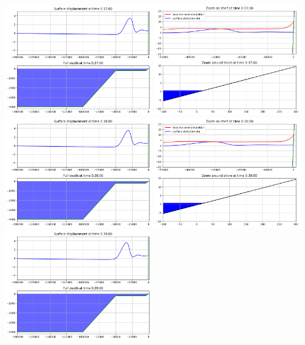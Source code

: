 \documentclass[11pt]{article}
\begin{document}
\vskip 10pt 
\includegraphics[width=0.475\textwidth]{frame0037fig0.png}
\includegraphics[width=0.475\textwidth]{frame0037fig1.png}
\vskip 10pt 
\includegraphics[width=0.475\textwidth]{frame0038fig0.png}
\includegraphics[width=0.475\textwidth]{frame0038fig1.png}
\vskip 10pt 
\includegraphics[width=0.475\textwidth]{frame0039fig0.png}
\end{document}
